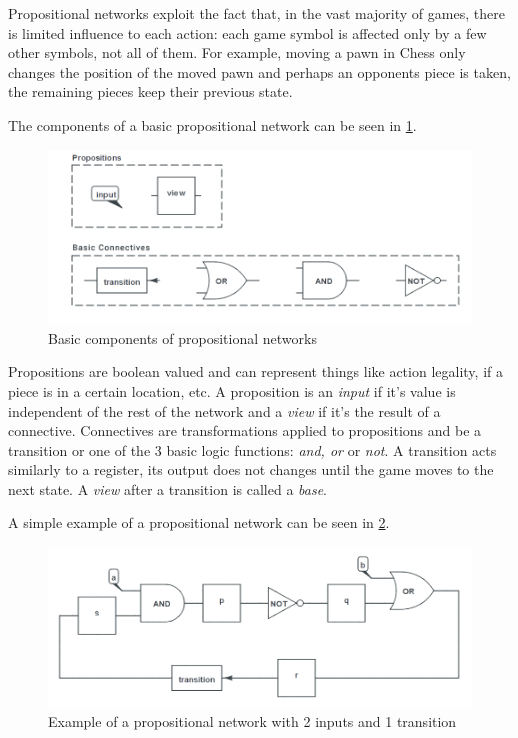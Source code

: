 Propositional networks exploit the fact that, in the vast majority of games, there is limited influence to each action: each game symbol is affected only by a few other symbols, not all of them. For example, moving a pawn in Chess only changes the position of the moved pawn and perhaps an opponents piece is taken, the remaining pieces keep their previous state.

The components of a basic propositional network can be seen in \ref{fig:propnets components}. 

\begin{figure}[h]
	\centering
    \includegraphics[scale=0.45]{images/propnets_components.png}
    \caption{Basic components of propositional networks}
    \label{fig:propnets components}
\end{figure}

Propositions are boolean valued and can represent things like action legality, if a piece is in a certain location, etc. A proposition is an \textit{input} if it's value is independent of the rest of the network and a \textit{view} if it's the result of a connective. 
Connectives are transformations applied to propositions and be a transition or one of the 3 basic logic functions: \textit{and, or} or \textit{not}. A transition acts similarly to a register, its output does not changes until the game moves to the next state. A \textit{view} after a transition is called a \textit{base}. 

A simple example of a propositional network can be seen in \ref{fig:propnets example}.

\begin{figure}[h]
	\centering
    \includegraphics[scale=0.45]{images/propnets_example.png}
    \caption{Example of a propositional network with 2 inputs and 1 transition}
    \label{fig:propnets example}
\end{figure}


